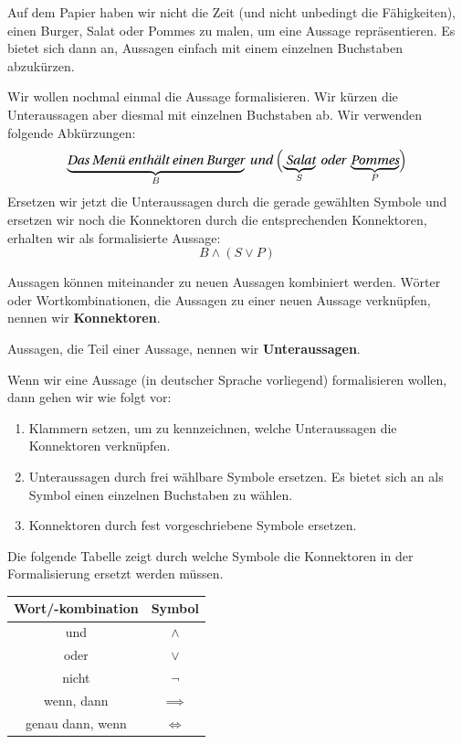 \documentclass[../../main.tex]{subfiles}
\begin{document}
Auf dem Papier haben wir nicht die Zeit (und nicht unbedingt die Fähigkeiten), einen Burger, Salat oder Pommes zu malen, um eine Aussage repräsentieren. Es bietet sich dann an, Aussagen einfach mit einem einzelnen Buchstaben abzukürzen. 
 
 \begin{example}
 Wir wollen nochmal einmal die Aussage  formalisieren. Wir kürzen die Unteraussagen aber diesmal mit einzelnen Buchstaben ab. Wir verwenden folgende Abkürzungen:
     \[\underbrace{\statement{Das Menü enthält einen Burger}}_{B}\statement{~und~}\Bigl(\underbrace{\statement{ Salat}}_{S}\statement{~oder~}\underbrace{\statement{Pommes}}_{P}\Bigr)\]
Ersetzen wir jetzt die Unteraussagen durch die gerade gewählten Symbole und ersetzen wir noch die Konnektoren durch die entsprechenden Konnektoren, erhalten wir als formalisierte Aussage:
    \[B \land (S \lor P)\]
 \end{example}

\begin{nutshell}

   Aussagen können miteinander zu neuen Aussagen kombiniert werden. Wörter oder Wortkombinationen, die Aussagen zu einer neuen Aussage verknüpfen, nennen wir \textbf{Konnektoren}.
   
   Aussagen, die Teil einer Aussage, nennen wir \textbf{Unteraussagen}.\bigskip
   
   Wenn wir eine Aussage (in deutscher Sprache vorliegend) formalisieren wollen, dann gehen wir wie folgt vor:
   \begin{enumerate}
       \item Klammern setzen, um zu kennzeichnen, welche Unteraussagen die Konnektoren verknüpfen.
       \item Unteraussagen durch frei wählbare Symbole ersetzen. Es bietet sich an als Symbol einen einzelnen Buchstaben zu wählen.
       \item Konnektoren durch fest vorgeschriebene Symbole ersetzen.
   \end{enumerate}
   
    Die folgende Tabelle zeigt durch welche Symbole die Konnektoren in der Formalisierung ersetzt werden müssen.
    
   \begin{center}
       \begin{tabular}{cc}\toprule
            Wort/-kombination & Symbol\\\midrule
            und &  $\land$\\
            oder&  $\lor$\\
            nicht & $\lnot$\\
            wenn, dann& $\implies$\\
            genau dann, wenn&  $\iff$\\\bottomrule
        \end{tabular}
    \end{center}
\end{nutshell}
    
\end{document}
